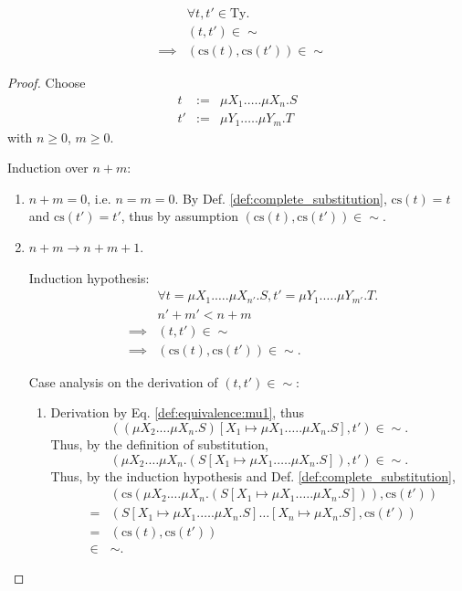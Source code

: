 \documentclass{llncs}
\newcommand*{\Ty}{\mathrm{Ty}}
\newcommand*{\cs}{\mathrm{cs}}
\newcommand*{\sequiv}{\sim}
\renewcommand*{\|}{\;|\;}
\begin{document}
\begin{lemma}
  \label{lemma:inversion_longest_muprefixes}
  \begin{eqnarray*}
    && \forall t, t' \in \Ty. \\
    && (t, t') \in \sequiv \\
    &\implies& (\cs(t), \cs(t')) \in \sequiv
  \end{eqnarray*}
\end{lemma}

\begin{proof}
  Choose
  \begin{eqnarray*}
    t  &:=& \mu X_1.\dots.\mu X_n.S \\
    t' &:=& \mu Y_1.\dots.\mu Y_m.T
  \end{eqnarray*}
  with $n \geq 0$, $m \geq 0$.

  Induction over $n + m$:
  \begin{enumerate}
    \item $n + m = 0$, i.e. $n = m = 0$. By Def. \ref{def:complete_substitution},
      $\cs(t) = t$ and $\cs(t') = t'$, thus by assumption
      $(\cs(t), \cs(t')) \in \sequiv$.

    \item $n + m \to n + m + 1$.

      Induction hypothesis:
      \begin{eqnarray*}
        && \forall t = \mu X_1.\dots.\mu X_{n'}.S, t' =\mu Y_1.\dots.\mu Y_{m'}.T. \\
        && n' + m' < n + m \\
        &\implies& (t, t') \in \sequiv \\
        &\implies& (\cs(t), \cs(t')) \in \sequiv.
      \end{eqnarray*}

      Case analysis on the derivation of $(t, t') \in \sequiv$:
      \begin{enumerate}
        \item
          \label{case:muprefixes:mu1}
          Derivation by Eq. \ref{def:equivalence:mu1}, thus
          \begin{equation*}
            ((\mu X_2.\dots\mu X_n.S)[X_1 \mapsto \mu X_1.\dots.\mu X_n.S], t') \in \sequiv.
          \end{equation*}
          Thus, by the definition of substitution,
          \begin{equation*}
            (\mu X_2.\dots\mu X_n.(S[X_1 \mapsto \mu X_1.\dots.\mu X_n.S]), t') \in \sequiv.
          \end{equation*}
          Thus, by the induction hypothesis and Def.
          \ref{def:complete_substitution},
          \begin{eqnarray*}
            &&  (\cs(\mu X_2.\dots\mu X_n.(S[X_1 \mapsto \mu X_1.\dots.\mu X_n.S])), \cs(t')) \\
            &=& (S[X_1 \mapsto \mu X_1.\dots.\mu X_n.S]\dots[X_n \mapsto \mu X_n.S], \cs(t')) \\
            &=& (\cs(t), \cs(t')) \\
            &\in& \sequiv.
          \end{eqnarray*}


\end{enumerate}
\end{enumerate}
\end{proof}
\end{document}
